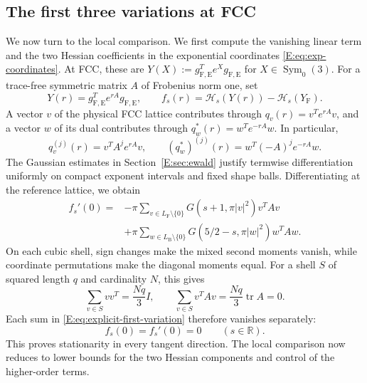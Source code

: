 \documentclass[reqno,english]{amsart}
\theoremstyle{definition}
\newtheorem{open problem}[theorem]{Open Problem}
\theoremstyle{remark}
\theoremstyle{plain}
\newcommand{\R}{{\mathbb R}}
\numberwithin{equation}{section}
\newcommand{\FCC}{L_{\mathrm F}}
\newcommand{\B}{L_{\mathrm B}}
\newcommand{\YF}{Y_{\mathrm F}}
\newcommand{\HH}{\mathcal H}
\newcommand{\tr}{\operatorname{tr}}
\newcommand{\gFE}{g_{\mathrm F,\mathrm E}}
\newcommand{\Symzero}{\operatorname{Sym}_0(3)}
\begin{document}
\subsection{The first three variations at FCC}\label{E:sec:derivative-first}
We now turn to the local comparison. We first compute the vanishing
linear term and the two Hessian coefficients in the exponential
coordinates \eqref{E:eq:exp-coordinates}. At FCC, these are
$Y(X):=\gFE^Te^X\gFE$ for $X\in\Symzero$.
For a trace-free symmetric matrix $A$ of Frobenius norm one, set
\[
 Y(r)=\gFE^{T}e^{rA}\gFE,\qquad
 f_s(r)=\HH_s(Y(r))-\HH_s(\YF).
\]
A vector $v$ of the physical FCC lattice contributes through
$q_v(r)=v^Te^{rA}v$, and a vector $w$ of its dual contributes through
$q_w^*(r)=w^Te^{-rA}w$. In particular,
\begin{equation}
 q_v^{(j)}(r)=v^TA^je^{rA}v,\qquad
 (q_w^*)^{(j)}(r)=w^T(-A)^je^{-rA}w.
 \label{E:eq:radial-q-derivatives}
\end{equation}
The Gaussian estimates in Section~\ref{E:sec:ewald} justify
termwise differentiation uniformly on compact exponent intervals and
fixed shape balls. Differentiating at the reference lattice, we obtain
\begin{align}
 f_s'(0)={}&-\pi\sum_{v\in\FCC\setminus\{0\}}
 G(s+1,\pi|v|^2)v^TAv\nonumber\\
 &+\pi\sum_{w\in\B\setminus\{0\}}
 G(5/2-s,\pi|w|^2)w^TAw.
 \label{E:eq:explicit-first-variation}
\end{align}
On each cubic shell, sign changes make the mixed second moments
vanish, while coordinate permutations make the diagonal moments equal.
For a shell $S$ of squared length $q$ and cardinality $N$, this gives
\[
 \sum_{v\in S}vv^T=\frac{Nq}{3}I,
 \qquad \sum_{v\in S}v^TAv=\frac{Nq}{3}\tr A=0.
\]
Each sum in \eqref{E:eq:explicit-first-variation} therefore vanishes separately:
\begin{equation}
 f_s(0)=f_s'(0)=0\qquad(s\in\R).
 \label{E:eq:stationarity-direct}
\end{equation}
This proves stationarity in every tangent direction. The local
comparison now reduces to lower bounds for the two Hessian components
and control of the higher-order terms.
\end{document}
